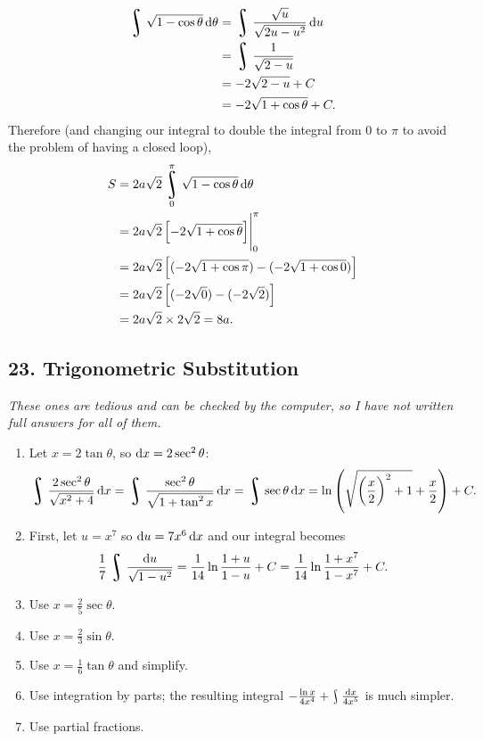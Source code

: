 \begin{enumerate}
\begin{align*}
          \rint \sqrt{1-\cos \theta} \dif{\theta} &= \rint \frac{\sqrt{u}}{\sqrt{2u - u^2}} \dif{u}\\
                                                  &= \rint \frac{1}{\sqrt{2 - u}}\\
                                                  &= -2\sqrt{2 - u} + C\\
                                                  &= -2\sqrt{1 + \cos \theta} + C.
        \end{align*}
        Therefore (and changing our integral to double the integral from $ 0 $ to $ \pi $ to avoid the problem of having a closed loop),
        \begin{align*}
          S &= 2a\sqrt{2} \rint^{\pi}_0 \sqrt{1-\cos\theta} \dif{\theta}\\
            &= 2a\sqrt{2} \eval{\left[ -2\sqrt{1 + \cos \theta} \right]}_0^{\pi}\\
            &= 2a\sqrt{2} \left[(-2\sqrt{1 + \cos \pi}) - (-2\sqrt{1 + \cos 0})\right]\\
            &= 2a\sqrt{2} \left[(-2\sqrt{0}) - (-2\sqrt{2})\right]\\
            &= 2a\sqrt{2} \times 2\sqrt{2} = 8a.
        \end{align*}
\end{enumerate}

\subsection*{23. Trigonometric Substitution}
\emph{These ones are tedious and can be checked by the computer, so I have not written full answers for all of them.}
\begin{enumerate}
  \item Let $ x = 2 \tan \theta $, so $ \dif{x} = 2\sec^2 \theta $:
        \begin{displaymath}
          \rint \frac{2\sec^2 \theta}{\sqrt{x^2 + 4}} \dif{x} = \rint \frac{\sec^2 \theta}{\sqrt{1 + \tan^2 x}} \dif{x} = \rint \sec \theta \dif{x}
            = \ln\left( \sqrt{\left(\frac{x}{2}\right)^2 + 1} + \frac{x}{2} \right) + C.
        \end{displaymath}
  \item First, let $ u = x^7 $ so $ \dif{u} = 7x^6 \dif{x} $ and our integral becomes
        \begin{displaymath}
          \frac{1}{7} \rint \frac{\dif{u}}{\sqrt{1 - u^2}} = \frac{1}{14} \ln \frac{1 + u}{1 - u} + C = \frac{1}{14} \ln \frac{1 + x^7}{1 - x^7} + C.
        \end{displaymath}
  \item Use $ x = \frac{2}{5} \sec \theta $.
  \item Use $ x = \frac{2}{3} \sin \theta $.
  \item Use $ x = \frac{1}{6} \tan \theta $ and simplify.
  \item Use integration by parts; the resulting integral $ - \frac{\ln x}{4x^4} + \rint \frac{\dif{x}}{4x^5} $ is much simpler.
  \item Use partial fractions.
\end{enumerate}


